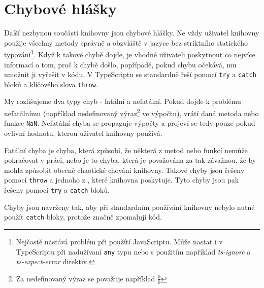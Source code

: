 \chapter{Chybové hlášky}
\label{chap:error-messages}

Další nezbynou součástí knihovny jsou chybové hlášky.
Ne vždy uživatel knihovny použije všechny metody správně a obzvláště v jazyce bez striktního statického typování\footnote{Nejčastě nástává problém při použítí JavaScriptu. Může nastat i v TypeScriptu při nadužívaní \texttt{any} typu nebo s použitím například \textit{ts-ignore} a \textit{ts-expect-error} direktiv.}.
Když k takové chybě dojde, je vhodné uživateli poskytnout co nejvíce informací o tom, proč k chybě došlo, popřípadě, pokud chybu očekává, mu umožnit ji vyřešit v kódu.
V TypeScriptu se  standardně řeší pomocí \texttt{try} a \texttt{catch} bloků a klíčového slova \texttt{throw}.

My rozlišujeme dva typy chyb - fatální a nefatální. Pokud dojde k problému nefatálnímu (například nedefinovaný výraz\footnote{Za nedefinovaný výraz se považuje například $\frac{0}{0}$} ve výpočtu), vrátí daná metoda nebo funkce \texttt{NaN}.
Nefatální chyba se propaguje výpočty a projeví se tedy pouze pokud ovlivní hodnotu, kterou uživatel knihovny používá.

Fatální chyba je chyba, která způsobí, že některá z metod nebo funkcí nemůže pokračovat v práci, nebo je to chyba, která je považována za tak závažnou, že by mohla způsobit obecně chaotické chování knihovny.
Takové chyby jsou řešeny pomocí \texttt{throw} a jednoho z , které knihovna poskytuje.
Tyto chyby jsou pak řešeny pomocí \texttt{try} a \texttt{catch} bloků.

Chyby jsou navrženy tak, aby při standardním používání knihovny nebylo nutné použít \texttt{catch} bloky, protože značně zpomalují kód\cite{stackoverflow:try-catch-performance:2013}.